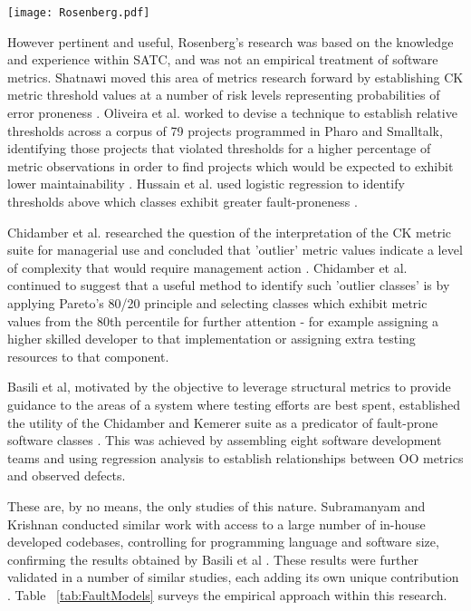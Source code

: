 \begin{table}
\begin{tabular}
 \centering 
 \texttt{[image: Rosenberg.pdf]}
 \label{tab:rosenberg}
\end{tabular}
\end{table}


However pertinent and useful, Rosenberg's research was based on the knowledge and experience within SATC, and was not an empirical treatment of software metrics. Shatnawi moved this area of metrics research forward by establishing CK metric threshold values at a number of risk levels representing probabilities of error proneness \citep{shatnawi2010quantitative}. Oliveira et al. worked to devise a technique to establish relative thresholds across a corpus of 79 projects programmed in Pharo and Smalltalk, identifying those projects that violated thresholds for a higher percentage of metric observations in order to find projects which would be expected to exhibit lower maintainability \citep{oliveira2015validating}. Hussain et al. used logistic regression to identify thresholds above which classes exhibit greater fault-proneness \citep{hussain2016detection}.

Chidamber et al. researched the question of the interpretation of the CK metric suite for managerial use and concluded that 'outlier' metric values indicate a level of complexity that would require management action \citep{chidamber1998managerial}. Chidamber et al. continued to suggest that a useful method to identify such 'outlier classes' is by applying Pareto's 80/20 principle and selecting classes which exhibit metric values from the 80th percentile for further attention - for example assigning a higher skilled developer to that implementation or assigning extra testing resources to that component.

Basili et al, motivated by the objective to leverage structural metrics to provide guidance to the areas of a system where testing efforts are best spent, established the utility of the Chidamber and Kemerer suite as a predicator of fault-prone software classes  \citep{basili1996validation}. This was achieved by assembling eight software development teams and using regression analysis to establish relationships between OO metrics and observed defects. 

These are, by no means, the only studies of this nature. Subramanyam and Krishnan conducted similar work with access to a large number of in-house developed codebases, controlling for programming language and software size, confirming the results obtained by Basili et al \citep{subramanyam2003empirical}. These results were further validated in a number of similar studies, each adding its own unique contribution \citep{el1999validation, tang1999empirical, cartwright2000empirical, el2001prediction, subramanyam2003empirical, gyimothy2005empirical, xu2008empirical, malhotra2012fault, okutan2014software, song2018comprehensive}. Table ~\ref{tab:FaultModels} surveys the empirical approach within this research.

